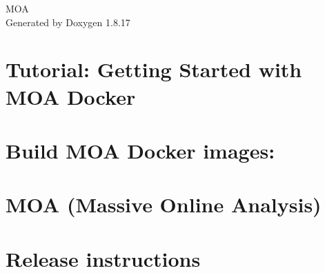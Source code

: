 \let\mypdfximage\pdfximage\def\pdfximage{\immediate\mypdfximage}\documentclass[twoside]{book}
\newcommand{\+}{\discretionary{\mbox{\scriptsize$\hookleftarrow$}}{}{}}
\newcommand{\clearemptydoublepage}{%
  \newpage{\pagestyle{empty}\cleardoublepage}%
}
\begin{document}
\hypersetup{pageanchor=false,
             bookmarksnumbered=true,
             pdfencoding=unicode
            }
\begin{titlepage}
\vspace*{7cm}
\begin{center}%
{\Large M\+OA }\\
\vspace*{1cm}
{\large Generated by Doxygen 1.8.17}\\
\end{center}
\end{titlepage}
\clearemptydoublepage
{}
\tableofcontents
\clearemptydoublepage
{}
\hypersetup{pageanchor=true}

\chapter{Tutorial\+: Getting Started with M\+OA Docker}
\label{md__c_1__users__edbard_eclipse-java-workspace__proyecto_m_o_a_docker_moa_docker_tutorial}

\chapter{Build M\+OA Docker images\+:}
\label{md__c_1__users__edbard_eclipse-java-workspace__proyecto_m_o_a_docker_readme}

\chapter{M\+OA (Massive Online Analysis)}
\label{md__c_1__users__edbard_eclipse-java-workspace__proyecto_m_o_a__r_e_a_d_m_e}

\chapter{Release instructions}
\label{md__c_1__users__edbard_eclipse-java-workspace__proyecto_m_o_a__r_e_l_e_a_s_e}

\end{document}
